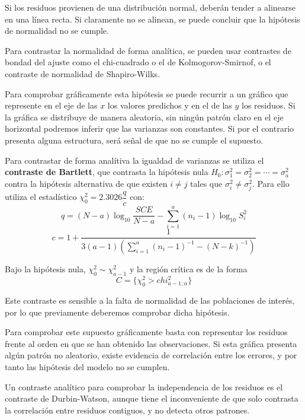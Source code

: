 Si los residuos provienen de una distribuci\'on normal, deber\'an tender a alinearse en una l\'inea recta. Si claramente no se alinean, se puede concluir que la hip\'otesis de normalidad no se cumple.

Para contrastar la normalidad de forma anal\'itica, se pueden usar contrastes de bondad del ajuste como el chi-cuadrado o el de Kolmogorov-Smirnof, o el contraste de normalidad de Shapiro-Wilks.


Para comprobar gr\'aficamente esta hip\'otesis se puede recurrir a un gr\'afico que represente en el eje de las $x$ los valores predichos y en el de las $y$ los residuos. Si la gr\'afica se distribuye de manera aleatoria, sin ning\'un patr\'on claro en el eje horizontal podremos inferir que las varianzas son constantes. Si por el contrario presenta alguna estructura, ser\'a se\~nal de que no se cumple el supuesto.

Para contrastar de forma anal\'itiva la igualdad de varianzas se utiliza el \textbf{contraste de Bartlett}, que contrasta la hip\'otesis nula $H_0:\sigma_1^2=\sigma_2^2=\cdots=\sigma_a^2$ contra la hip\'otesis alternativa de que existen $i\neq j$ tales que $\sigma_i^2\neq\sigma_j^2$. Para ello utiliza el estad\'istico $\chi^2_0=2.3026\dfrac{q}{c}$ con:
\[q=(N-a)\log_{10}{\dfrac{SCE}{N-a}}-\sum_{i=1}^a(n_i-1)\log_{10}{S_i^2}\]
\[c=1+\dfrac{1}{3(a-1)\left(\sum_{i=1}^a(n_i-1)^{-1}-(N-k)^{-1}\right)}\]

Bajo la hip\'otesis nula, $\chi^2_0\sim\chi^2_{a-1}$ y la regi\'on cr\'itica es de la forma
\[C=\{\chi^2_0>chi^2_{a-1;\alpha}\}\]

Este contraste es sensible a la falta de normalidad de las poblaciones de inter\'es, por lo que previamente deberemos comprobar dicha hip\'otesis.


Para comprobar este supuesto gr\'aficamente basta con representar los residuos frente al orden en que se han obtenido las observaciones. Si esta gr\'afica presenta alg\'un patr\'on no aleatorio, existe evidencia de correlaci\'on entre los errores, y por tanto las hip\'otesis del modelo no se cumplen.

Un contraste anal\'itico para comprobar la independencia de los residuos es el contraste de Durbin-Watson, aunque tiene el inconveniente de que solo contrasta la correlaci\'on entre residuos contiguos, y no detecta otros patrones.

